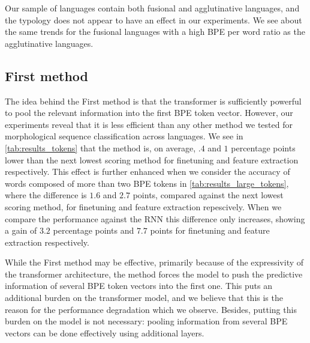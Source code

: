 \documentclass[11pt]{article}
\newcommand\adam[1]{(\textbf{Adam:} #1)}
\begin{document}
        Our sample of languages contain both fusional and
     agglutinative languages, and the typology does not appear to have
     an effect in our experiments. We see about the same trends for
     the fusional languages with a high BPE per word ratio as the
     agglutinative languages.

    

    \subsection{First method}

            The idea behind the First method is that the transformer is
     sufficiently powerful to pool the relevant information into the
     first BPE token vector.
                            However, our experiments reveal that it is
     less efficient than any other method we tested for morphological
     sequence classification across languages. We see in
     \cref{tab:results_tokens} that the method is, on average, $.4$
     and $1$ percentage points lower than the next lowest scoring
     method for finetuning and feature extraction respectively.
             This effect is further enhanced when we consider the
     accuracy of words composed of more than two BPE tokens in
     \cref{tab:results_large_tokens}, where the difference is $1.6$
     and $2.7$ points, compared against the next lowest scoring
     method, for finetuning and feature extraction repescively. When
     we compare the performance against the RNN this difference only
     increases, showing a gain of $3.2$ percentage points and $7.7$
     points for finetuning and feature extraction respectively.

                             While the First method may be effective,
     primarily because of the expressivity of the transformer
     architecture, the method forces the model to push the predictive
     information of several BPE token vectors into the first one. This
     puts an additional burden on the transformer model, and we believe that this
     is the reason for the performance degradation which we observe.
     Besides, putting this burden on the model is not necessary: pooling
     information from several BPE vectors can be done effectively using additional layers.
\end{document}
